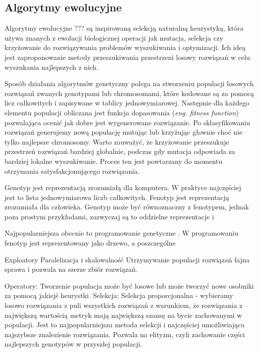 \subsection{Algorytmy ewolucyjne}
Algorytmy ewolucyjne \cite{EA} ??? są inspirowaną selekcją naturalną heurystyką, która używa znanych z ewolucji biologicznej operacji jak mutacja, selekcja czy krzyżowanie do rozwiązywania problemów wyszukiwania i optymizacji. Ich ideą jest zaproponowanie metody przeszukiwania przestrzeni losowy rozwiązań w celu wyszukania najlepszych z nich. 

Sposób działania algorytmów genetyczny polega na stworzeniu populacji losowych rozwiązań zwanych genotypami lub chromosomami, które kodowane są za pomocą licz całkowitych i zapisywane w tablicy jednowymiarowej. Następnie dla każdego elementu populacji obliczana jest funkcja dopasowania (\textit{eng. fitness function}) pozwalająca ocenić jak dobre jest wygenerowane rozwiązanie. Po sklasyfikowaniu rozwiązań generujemy nową populację mutując lub krzyżując głownie choć nie tylko najlepsze chromosomy. Warto zauważyć, że krzyżowanie przeszukuje przestrzeń rozwiązań bardziej globalnie, podczas gdy mutacja odpowiada za bardziej lokalne wyszukiwanie. Proces ten jest powtarzany do momentu otrzymania satysfakcjonującego rozwiązania.  

Genotyp jest reprezentacją zrozumiałą dla komputera. W praktyce najczęściej jest to lista jednowymiarowa liczb całkowitych. 
Fenotyp jest reprezentacją zrozumiała dla człowieka. Genotyp może być równoznaczny z fenotypem, jednak poza prostym przykładami, zazwyczaj są to oddzielne reprezentacje i   

Najpopularniejsza obecnie to programowanie genetyczne \cite{10.5555/138936}. W programowaniu fenotyp jest reprezentowany jako drzewo, a poszczególne 

Exploatory
Paralelizacja i skalowalność
Utrzymywanie populacji rozwiązań fajna sprawa i pozwala na szerze zbiór rozwiązań.

Operatory:
Tworzenie populacja może być losowe lub może tworzyć nowe osobniki za pomocą jakiejś heurystki. 
Selekcja:
Selekcja proporcjonalna - wybieramy losowo rozwiązania z puli wszystkich rozwiązań z warunkiem, że rozwiązania z największą wartością metryk mają największą szansę na bycie zachowanymi w populacji. Jest to najpopularniejsza metoda selekcji i najczęściej umożliwiająca najszybsze znalezienie rozwiązania. Pozwala na elityzm, czyli zachowanie części najlepszych genotypów w przyszłej populacji.

